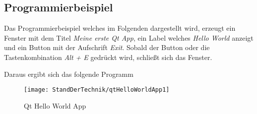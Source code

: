 \subsection{Programmierbeispiel}
\label{subsec:programmierbeispiel}
Das Programmierbeispiel welches im Folgenden dargestellt wird, erzeugt ein Fenster mit dem Titel 
\emph{Meine erste Qt App}, ein Label welches \emph{Hello World} anzeigt und ein Button mit der
Aufschrift \emph{Exit}. Sobald der Button oder die Tastenkombination \emph{Alt + E} gedrückt
wird, schließt sich das Fenster.



Daraus ergibt sich das folgende Programm
\begin{figure}[h]
    \centering
    \texttt{[image: StandDerTechnik/qtHelloWorldApp1]}
    \caption[Qt Hello World App]{Qt Hello World App}
    \label{img:qtHelloWorldApp}
\end{figure}
